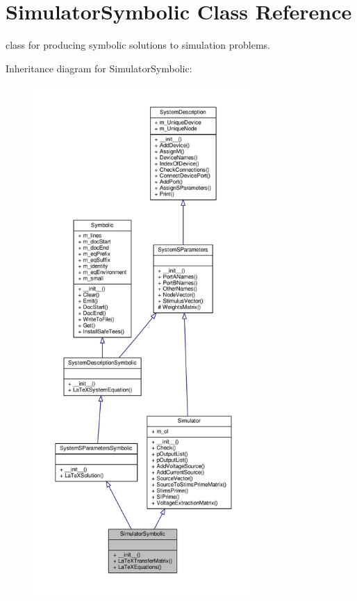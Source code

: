 \hypertarget{classSignalIntegrity_1_1SystemDescriptions_1_1SimulatorSymbolic_1_1SimulatorSymbolic}{}\section{Simulator\+Symbolic Class Reference}
\label{classSignalIntegrity_1_1SystemDescriptions_1_1SimulatorSymbolic_1_1SimulatorSymbolic}


class for producing symbolic solutions to simulation problems.  




Inheritance diagram for Simulator\+Symbolic\+:\nopagebreak
\begin{figure}[H]
\begin{center}
\leavevmode
\includegraphics[height=550pt]{classSignalIntegrity_1_1SystemDescriptions_1_1SimulatorSymbolic_1_1SimulatorSymbolic__inherit__graph}
\end{center}
\end{figure}


